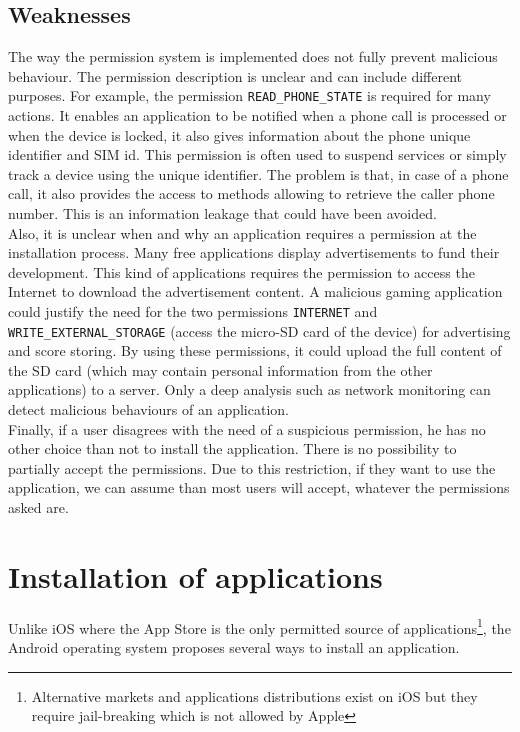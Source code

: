 \subsection{Weaknesses}

The way the permission system is implemented does not fully prevent malicious behaviour.
The permission description is unclear and can include different purposes.
For example, the permission \texttt{READ\_PHONE\_STATE} is required for many actions.
It enables an application to be notified when a phone call is processed or when the device is locked, it also gives information about the phone unique identifier and SIM id.
This permission is often used to suspend services or simply track a device using the unique identifier.
The problem is that, in case of a phone call, it also provides the access to methods allowing to retrieve the caller phone number.
This is an information leakage that could have been avoided.\\

Also, it is unclear when and why an application requires a permission at the installation process.
Many free applications display advertisements to fund their development.
This kind of applications requires the permission to access the Internet to download the advertisement content.
A malicious gaming application could justify the need for the two permissions \texttt{INTERNET} and \texttt{WRITE\_EXTERNAL\_STORAGE} (access the micro-SD card of the device) for advertising and score storing.
By using these permissions, it could upload the full content of the SD card (which may contain personal information from the other applications) to a server.
Only a deep analysis such as network monitoring can detect malicious behaviours of an application.\\

Finally, if a user disagrees with the need of a suspicious permission, he has no other choice than not to install the application.
There is no possibility to partially accept the permissions.
Due to this restriction, if they want to use the application, we can assume than most users will accept, whatever the permissions asked are.

\section{Installation of applications}

Unlike iOS where the App Store is the only permitted source of applications\footnote{Alternative markets and applications distributions exist on iOS but they require jail-breaking which is not allowed by Apple}, the Android operating system proposes several ways to install an application.

